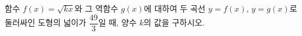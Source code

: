 \hspace*{2mm}\begin{minipage}[t]{\dimexpr\linewidth-2mm\relax}\vspace{0pt}
함수 $f(x)=\sqrt{kx}$와 그 역함수 $g(x)$에 대하여 두 곡선 $y=f(x)$, $y=g(x)$로 둘러싸인 도형의 넓이가 $\dfrac{49}{3}$일 때, 양수 $k$의 값을 구하시오.\end{minipage}
